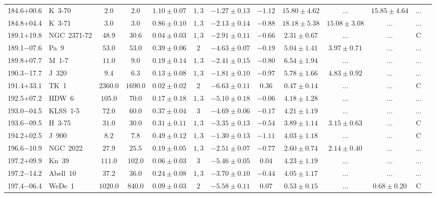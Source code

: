 \documentclass[useAMS]{mn2e}
\begin{document}
\begin{center}
{\begin{longtable}{llccccccccccc}
184.6$+$00.6&K~3-70&$       2.0$&$       2.0$&$1.10 \pm 0.07$&$1,3$&$-1.27 \pm 0.13$&$     -1.12$&$15.80 \pm 4.62$&$...$&$15.85 \pm 4.64$&...\\
184.8$+$04.4&K~3-71&$       3.0$&$       3.0$&$0.86 \pm 0.10$&$1,3$&$-2.13 \pm 0.14$&$     -0.88$&$18.18 \pm 5.38$&$15.08 \pm 3.08$&$...$&...\\
189.1$+$19.8&NGC~2371-72&$      48.9$&$      30.6$&$0.04 \pm 0.03$&$1,3$&$-2.91 \pm 0.11$&$     -0.66$&$2.31 \pm 0.67$&$...$&$...$&C\\
189.1$-$07.6&Pa~9&$      53.0$&$      53.0$&$0.39 \pm 0.06$&$2$&$-4.63 \pm 0.07$&$     -0.19$&$5.04 \pm 1.41$&$3.97 \pm 0.71$&$...$&...\\
189.8$+$07.7&M~1-7&$      11.0$&$       9.0$&$0.19 \pm 0.14$&$1,3$&$-2.41 \pm 0.15$&$     -0.80$&$6.54 \pm 1.94$&$...$&$...$&...\\
190.3$-$17.7&J~320&$       9.4$&$       6.3$&$0.13 \pm 0.08$&$1,3$&$-1.81 \pm 0.10$&$     -0.97$&$5.78 \pm 1.66$&$4.83 \pm 0.92$&$...$&...\\
191.4$+$33.1&TK~1&$    2360.0$&$    1690.0$&$0.02 \pm 0.02$&$2$&$-6.63 \pm 0.11$&$      0.36$&$0.47 \pm 0.14$&$...$&$...$&C\\
192.5$+$07.2&HDW~6&$     105.0$&$      70.0$&$0.17 \pm 0.18$&$1,3$&$-5.10 \pm 0.18$&$     -0.06$&$4.18 \pm 1.28$&$...$&$...$&...\\
193.0$-$04.5&KLSS~1-5&$      72.0$&$      60.0$&$0.37 \pm 0.04$&$3$&$-4.69 \pm 0.06$&$     -0.17$&$4.21 \pm 1.19$&$...$&$...$&...\\
193.6$-$09.5&H~3-75&$      31.0$&$      30.0$&$0.31 \pm 0.11$&$1,3$&$-3.35 \pm 0.13$&$     -0.54$&$3.89 \pm 1.14$&$3.15 \pm 0.63$&$...$&C\\
194.2$+$02.5&J~900&$       8.2$&$       7.8$&$0.49 \pm 0.12$&$1,3$&$-1.30 \pm 0.13$&$     -1.11$&$4.03 \pm 1.18$&$...$&$...$&C\\
196.6$-$10.9&NGC~2022&$      27.9$&$      25.5$&$0.19 \pm 0.05$&$1,3$&$-2.51 \pm 0.07$&$     -0.77$&$2.60 \pm 0.74$&$2.14 \pm 0.40$&$...$&...\\
197.2$+$09.9&Kn~39&$     111.0$&$     102.0$&$0.06 \pm 0.03$&$3$&$-5.46 \pm 0.05$&$      0.04$&$4.23 \pm 1.19$&$...$&$...$&...\\
197.2$-$14.2&Abell~10&$      37.2$&$      36.0$&$0.24 \pm 0.08$&$1,3$&$-3.70 \pm 0.10$&$     -0.44$&$4.05 \pm 1.17$&$...$&$...$&...\\
197.4$-$06.4&WeDe~1&$    1020.0$&$     840.0$&$0.09 \pm 0.03$&$2$&$-5.58 \pm 0.11$&$      0.07$&$0.53 \pm 0.15$&$...$&$0.68 \pm 0.20$&C\\

\end{longtable}}
\end{center}
\end{document}
